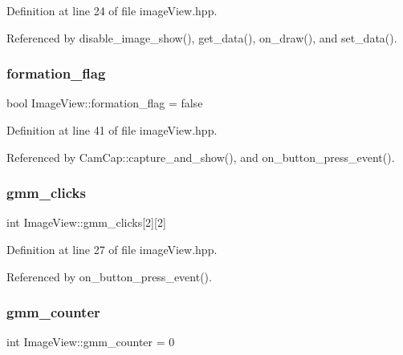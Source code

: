 Definition at line 24 of file image\+View.\+hpp.



Referenced by disable\+\_\+image\+\_\+show(), get\+\_\+data(), on\+\_\+draw(), and set\+\_\+data().

\mbox{\label{class_image_view_a44427e978ef9239514b7149ebf59022c}} 
\subsubsection{\texorpdfstring{formation\+\_\+flag}{formation\_flag}}
{\footnotesize\ttfamily bool Image\+View\+::formation\+\_\+flag = false}



Definition at line 41 of file image\+View.\+hpp.



Referenced by Cam\+Cap\+::capture\+\_\+and\+\_\+show(), and on\+\_\+button\+\_\+press\+\_\+event().

\mbox{\label{class_image_view_a88c64a515c30ba486252ba440bf9f9eb}} 
\subsubsection{\texorpdfstring{gmm\+\_\+clicks}{gmm\_clicks}}
{\footnotesize\ttfamily int Image\+View\+::gmm\+\_\+clicks\mbox{[}2\mbox{]}\mbox{[}2\mbox{]}}



Definition at line 27 of file image\+View.\+hpp.



Referenced by on\+\_\+button\+\_\+press\+\_\+event().

\mbox{\label{class_image_view_a1d02972f5193d7ce806802dd2505f1f2}} 
\subsubsection{\texorpdfstring{gmm\+\_\+counter}{gmm\_counter}}
{\footnotesize\ttfamily int Image\+View\+::gmm\+\_\+counter = 0}



